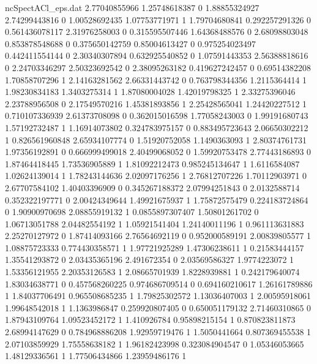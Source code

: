 \begin{filecontents}{ncSpectACl_eps.dat}
2.77040855966 1.25748618387 0
1.88855324927 2.74299443816 0
1.00528692435 1.07753771971 1
1.79704680841 0.292257291326 0
0.561436078117 2.31976258003 0
0.315595507446 1.64368488576 0
2.68098803048 0.853878548688 0
0.375650142759 0.85004613427 0
0.975254023497 0.442411554144 0
2.30340307894 0.632925540852 0
1.07591443353 2.56388818616 0
2.24703346297 2.50323692542 0
2.38095263182 0.419627242457 0
0.69514382208 1.70858707296 1
2.14163281562 2.66331443742 0
0.763798344356 1.2115364414 1
1.98230834183 1.3403275314 1
1.87080004028 1.42019798325 1
2.33275396046 2.23788956508 0
2.17549570216 1.45381893856 1
2.25428565041 1.24420227512 1
0.710107336939 2.61373708098 0
0.362015016598 1.77058243003 0
1.99191680743 1.57192732487 1
1.16914073802 0.324783975157 0
0.883495723643 2.06650302212 1
0.826561960848 2.65934107774 0
1.51920752058 1.1490363093 1
2.80374761731 1.97356192891 0
0.666999499018 2.40499068052 0
1.59920753478 2.77443186893 0
1.87464418445 1.73536905889 1
1.81092212473 0.985245134647 1
1.6116584087 1.02624139014 1
1.78243144636 2.02097176256 1
2.76812707226 1.70112903971 0
2.67707584102 1.40403396909 0
0.345267188372 2.07994251843 0
2.0132588714 0.352322197771 0
2.00424349644 1.49921675937 1
1.75872575479 0.224183724864 0
1.90900970698 2.08855919132 1
0.0855897307407 1.50801261702 0
1.06713051788 2.04482554192 1
1.05921541404 1.24140011196 1
0.961113631883 2.25270127972 0
1.87414093166 2.76564692119 0
0.952000589191 2.00839805577 1
1.08875723333 0.774430358571 1
1.97721925289 1.47306238611 1
0.21583444157 1.35541293872 0
2.03435365196 2.491672354 0
2.03569586327 1.9774223072 1
1.53356121955 2.20353126583 1
2.08665701939 1.8228939881 1
0.242179640074 1.83034638771 0
0.457568260225 0.974686709514 0
0.694160210617 1.26161789886 1
1.84037706491 0.965508685235 1
1.79825302572 1.13036407003 1
2.00595918061 1.99648542018 1
1.1363986847 0.259920807405 0
0.650051179132 2.71460310865 0
1.87943109764 1.09523452172 1
1.410926784 0.95898215154 1
0.870823811873 2.68994147629 0
0.784968886208 1.92959719476 1
1.5050441664 0.807369455538 1
2.07103859929 1.75558638182 1
1.96182423998 0.323084904547 0
1.05346053665 1.48129336561 1
1.77506434866 1.23959486176 1
\end{filecontents}
